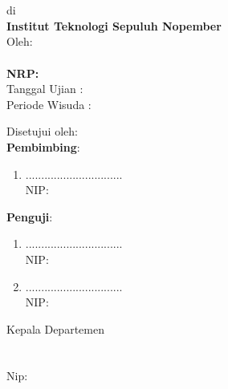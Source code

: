      
{ \AddToShipoutPicture*{\BackgroundIm}
\begin{center}

\Large\textbf{\pPengesahan}
\end{center}
\begin{center}
\tsss\\
\textbf{\ggGelar}\\
di\\
\textbf{Institut Teknologi Sepuluh Nopember}\\
\vspace{1ex}
Oleh:\\
\textbf{\NamaMahasiswa}\\ 
\textbf{NRP:\NrpMahasiswa}\\ 
\vspace{1ex}
Tanggal Ujian :\TglUjian\\
Periode Wisuda : \PerWisuda\\
\vspace{1ex}
\end{center}
\begin{center}
Disetujui oleh:\\
\textbf{Pembimbing}:
\end{center}
\begin{enumerate}
\item \PbSatu \hfill ...............................\\
NIP:\NipPbSatu \vfill
{}\vfill
{}
\end{enumerate}	
\begin{center}
	\textbf{Penguji}:
\end{center}
\begin{enumerate}
	\item \PjSatu \hfill ...............................\\
	NIP:\NipPjSatu
	\vfill
	\item \PjDua \hfill ...............................\\
	NIP:\NipPjDua\vfill
{}
\end{enumerate}	
\vfill
\begin{center}
	Kepala Departemen \Dep \\
	 \fak\\
	\vspace{9ex}
	\underline{\NmKaDep}\\
	Nip:\NipKaDep
\end{center}
\newpage
}
